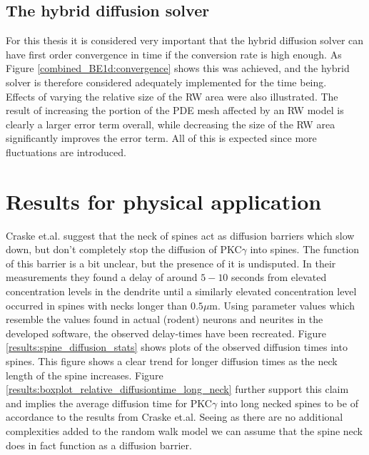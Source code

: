 \subsection{The hybrid diffusion solver}
For this thesis it is considered very important that the hybrid diffusion solver can have first order convergence in time if the conversion rate is high enough. 
As Figure \ref{combined_BE1d:convergence} shows this was achieved, and the hybrid solver is therefore considered adequately implemented for the time being.\\

Effects of varying the relative size of the RW area were also illustrated. 
The result of increasing the portion of the PDE mesh affected by an RW model is clearly a larger error term overall, while decreasing the size of the RW area significantly improves the error term. 
All of this is expected since more fluctuations are introduced.

\section{Results for physical application}

Craske et.al. suggest that the neck of spines act as diffusion barriers which slow down, but don't completely stop the diffusion of PKC$\gamma$ into spines. 
The function of this barrier is a bit unclear, but the presence of it is undisputed. 
In their measurements they found a delay of around $5-10$ seconds from elevated concentration levels in the dendrite until a similarly elevated concentration level occurred in spines with necks longer than $0.5\mu$m. 
Using parameter values which resemble the values found in actual (rodent) neurons and neurites in the developed software, the observed delay-times have been recreated. 
Figure \ref{results:spine_diffusion_stats} shows plots of the observed diffusion times into spines. 
This figure shows a clear trend for longer diffusion times as the neck length of the spine increases. 
Figure \ref{results:boxplot_relative_diffusiontime_long_neck} further support this claim and implies the average diffusion time for PKC$\gamma$ into long necked spines to be of accordance to the results from Craske et.al.
Seeing as there are no additional complexities added to the random walk model we can assume that the spine neck does in fact function as a diffusion barrier.

